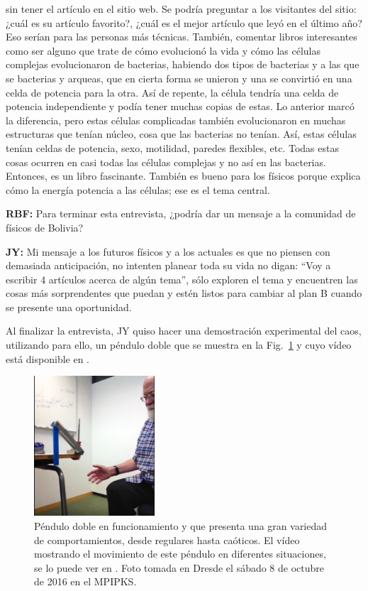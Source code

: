 \documentclass{rbf}
\newcommand{\mr}{{\bf RBF: }}
\newcommand{\jim}{{\bf JY: }}
\begin{document}
sin tener el artículo en el sitio web. Se podría preguntar a los visitantes del sitio:  ¿cuál es su artículo favorito?, ¿cuál es el mejor artículo que leyó en el último año? Eso serían para las personas más técnicas. También, comentar libros interesantes como ser alguno que trate de cómo evolucionó la vida y cómo las células complejas evolucionaron de bacterias, habiendo dos tipos de bacterias y a las que se bacterias y arqueas, que en cierta forma se unieron y una se convirtió en una celda de potencia para la otra. Así de repente, la célula tendría una celda de potencia independiente y podía tener muchas copias de estas. Lo anterior marcó la diferencia, pero estas células complicadas también evolucionaron en muchas estructuras que tenían núcleo, cosa que las bacterias no tenían. Así, estas células tenían  celdas de potencia, sexo, motilidad, paredes flexibles, etc. Todas estas cosas ocurren en casi todas las células complejas y no así en las bacterias. Entonces, es un libro fascinante. También es bueno para los físicos porque explica cómo la energía potencia a las células; ese es el tema central.

\mr Para terminar esta entrevista, ¿podría dar un mensaje a la comunidad de físicos de Bolivia?

\jim Mi mensaje a los futuros físicos y a los actuales es que no piensen con demasiada anticipación, no intenten planear toda su vida
no digan: ``Voy a escribir 4 artículos acerca de algún tema'', sólo exploren el tema y encuentren las cosas más sorprendentes que puedan
y estén listos para cambiar al plan B cuando se presente una oportunidad.

Al finalizar la entrevista, JY quiso hacer una demostración experimental del caos, utilizando para ello, un péndulo doble que se muestra en la Fig.~\ref{JY2} y cuyo vídeo está disponible en \cite{YT16}.
\begin{figure}[tbp!]
 \centering
  \includegraphics[width=0.4\textwidth]{Jim_Yorke_2.pdf}
 \caption{Péndulo doble en funcionamiento y que presenta una gran variedad de comportamientos, desde regulares hasta caóticos. El vídeo mostrando el movimiento de este péndulo en diferentes situaciones, se lo puede ver en \cite{YT16}. Foto tomada en Dresde el sábado 8 de octubre de 2016 en el MPIPKS.}
 \label{JY2}
\end{figure}
\end{document}
